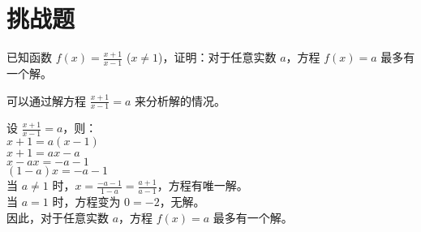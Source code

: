 \section{挑战题}

\begin{challengeexercise}{4}
已知函数 $f(x) = \frac{x+1}{x-1}$ ($x \neq 1$)，证明：对于任意实数 $a$，方程 $f(x) = a$ 最多有一个解。
\end{challengeexercise}

\begin{hint}
可以通过解方程 $\frac{x+1}{x-1} = a$ 来分析解的情况。
\end{hint}

\begin{answer}
设 $\frac{x+1}{x-1} = a$，则：\\
$x + 1 = a(x - 1)$ \\
$x + 1 = ax - a$ \\
$x - ax = -a - 1$ \\
$(1-a)x = -a - 1$ \\
当 $a \neq 1$ 时，$x = \frac{-a-1}{1-a} = \frac{a+1}{a-1}$，方程有唯一解。\\
当 $a = 1$ 时，方程变为 $0 = -2$，无解。\\
因此，对于任意实数 $a$，方程 $f(x) = a$ 最多有一个解。
\end{answer}
